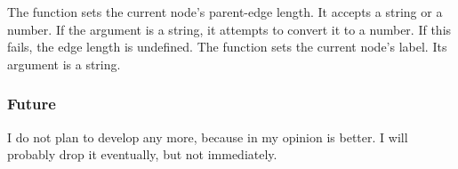 The  function sets the current node's parent-edge length. It accepts
a string or a number. If the argument is a string, it attempts to convert it to
a number. If this fails, the edge length is undefined. The 
function sets the current node's label. Its argument is a string.

\subsubsection{Future}

I do not plan to develop \sched{} any more, because in my opinion \luaed{} is
better. I will probably drop it eventually, but not immediately.
